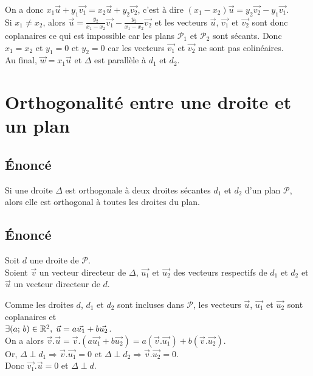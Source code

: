 \documentclass[12px]{article}
\begin{document}
	On a donc $x_1\vec{u} + y_1\vec{v_1} = x_2\vec{u} + y_2\vec{v_2}$, c'est à dire $(x_1 - x_2)\vec{u} = y_2\vec{v_2} - y_1\vec{v_1}$.\\
	
	Si $x_1 \not= x_2$, alors $\vec{u} = \frac{y_2}{x_1 - x_2}\vec{v_1} - \frac{y_2}{x_1 - x_2}\vec{v_2}$ et les vecteurs $\vec{u}$, $\vec{v_1}$ et $\vec{v_2}$ sont donc coplanaires ce qui est impossible car les plans $\mathcal{P}_1$ et $\mathcal{P}_2$ sont sécants.
	Donc $x_1 = x_2$ et $y_1 = 0$ et $y_2 = 0$ car les vecteurs $\vec{v_1}$ et $\vec{v_2}$ ne sont pas colinéaires.\\
	Au final, $\vec{w} = x_1\vec{u}$ et $\Delta$ est parallèle à $d_1$ et $d_2.$
	
	\section{Orthogonalité entre une droite et un plan}
	
	\subsection{\'Enoncé}
	Si une droite $\Delta$ est orthogonale à deux droites sécantes $d_1$ et $d_2$ d'un plan $\mathcal{P}$, alors elle est orthogonal à toutes les droites du plan.
	
	\subsection{\'Enoncé}
	Soit $d$ une droite de $\mathcal{P}$.\\
	Soient $\vec{v}$ un vecteur directeur de $\Delta$, $\vec{u_1}$ et $\vec{u_2}$ des vecteurs respectifs de $d_1$ et $d_2$ et $\vec{u}$ un vecteur directeur de $d$.
	
	Comme les droites $d$, $d_1$ et $d_2$ sont incluses dans $\mathcal{P}$, les vecteurs $\vec{u}$, $\vec{u_1}$ et $\vec{u_2}$ sont coplanaires et\\
	$\exists(a;\, b)\in\mathbb{R}^2,\; \vec{u} = a\vec{u_1} + b\vec{u_2}$.\\
	On a alors $\vec{v}.\vec{u} = \vec{v}.(a\vec{u_1} + b\vec{u_2})
	= a(\vec{v}.\vec{u_1}) + b(\vec{v}.\vec{u_2})$.\\
	Or, $\Delta\perp d_1 \Rightarrow \vec{v}.\vec{u_1} = 0$ et $\Delta\perp d_2 \Rightarrow \vec{v}.\vec{u_2} = 0$.\\
	Donc $\vec{v_1}.\vec{u} = 0$ et $\Delta\perp d$.
	
\end{document}
